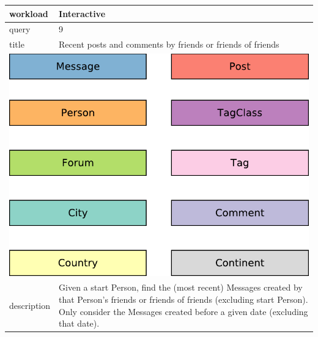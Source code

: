 \renewcommand*{\arraystretch}{1.1}

\noindent\begin{tabularx}{17cm}{|p{1.95cm}|X|}
	\hline
	workload    & Interactive \\ \hline
%
	query       & 9 \\ \hline
%
	title       & Recent posts and comments by friends or friends of friends \\ \hline
	\multicolumn{2}{|c|}{ \includegraphics[scale=\patternscale,margin=0cm .2cm]{patterns/interactive09}} \\ \hline
	description & Given a start Person, find the (most recent) Messages created by that
Person's friends or friends of friends (excluding start Person). Only
consider the Messages created before a given date (excluding that date).
 \\ \hline
	

\end{tabularx}
